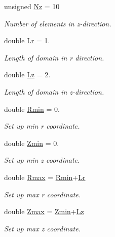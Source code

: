 \begin{DoxyCompactItemize}
unsigned \hyperlink{namespaceGlobal__Parameters_a1f35a0690c7745167a7178fb71f92e6e}{Nz} = 10
\begin{DoxyCompactList}\small\item\em Number of elements in z-\/direction. \end{DoxyCompactList}\item 
double \hyperlink{namespaceGlobal__Parameters_a444f5c911c8805ad2ba45ed8b1b8904e}{Lr} = 1.
\begin{DoxyCompactList}\small\item\em Length of domain in r direction. \end{DoxyCompactList}\item 
double \hyperlink{namespaceGlobal__Parameters_a2bcf0bd846d839f1e3bb04a6c0a612c1}{Lz} = 2.
\begin{DoxyCompactList}\small\item\em Length of domain in z-\/direction. \end{DoxyCompactList}\item 
double \hyperlink{namespaceGlobal__Parameters_ab0e73c8b2e1105b14203856b81efa8cf}{Rmin} = 0.
\begin{DoxyCompactList}\small\item\em Set up min r coordinate. \end{DoxyCompactList}\item 
double \hyperlink{namespaceGlobal__Parameters_a1813b913bc85d4ce15ea68226ba6c63f}{Zmin} = 0.
\begin{DoxyCompactList}\small\item\em Set up min z coordinate. \end{DoxyCompactList}\item 
double \hyperlink{namespaceGlobal__Parameters_a06f5ea713550f61da323eafb91fceedd}{Rmax} = \hyperlink{namespaceGlobal__Parameters_ab0e73c8b2e1105b14203856b81efa8cf}{Rmin}+\hyperlink{namespaceGlobal__Parameters_a444f5c911c8805ad2ba45ed8b1b8904e}{Lr}
\begin{DoxyCompactList}\small\item\em Set up max r coordinate. \end{DoxyCompactList}\item 
double \hyperlink{namespaceGlobal__Parameters_a36b7b169826f906d1d8d1a3aa4347d80}{Zmax} = \hyperlink{namespaceGlobal__Parameters_a1813b913bc85d4ce15ea68226ba6c63f}{Zmin}+\hyperlink{namespaceGlobal__Parameters_a2bcf0bd846d839f1e3bb04a6c0a612c1}{Lz}
\begin{DoxyCompactList}\small\item\em Set up max z coordinate. \end{DoxyCompactList}\end{DoxyCompactItemize}


